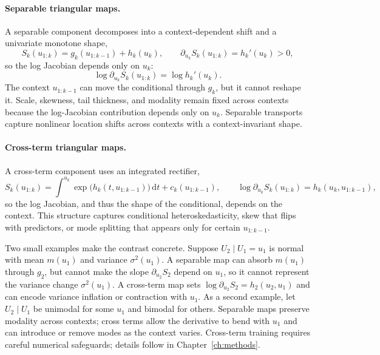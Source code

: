 \documentclass[11pt,a4paper,twoside]{book}\usepackage[]{graphicx}\usepackage[]{xcolor}
\begin{document}
\paragraph{Separable triangular maps.} A separable component decomposes into a context-dependent shift and a univariate monotone shape,
\begin{equation}
  S_k(u_{1:k}) = g_k(u_{1:k-1}) + h_k(u_k),
  \qquad
  \partial_{u_k}S_k(u_{1:k}) = h_k'(u_k) > 0,
  \label{eq:separable-component}
\end{equation}
so the log Jacobian depends only on $u_k$:
\begin{equation}
  \log \partial_{u_k}S_k(u_{1:k}) = \log h_k'(u_k).
  \label{eq:separable-jacobian}
\end{equation}
The context $u_{1:k-1}$ can move the conditional through $g_k$, but it cannot reshape it. Scale, skewness, tail thickness, and modality remain fixed across contexts because the log-Jacobian contribution depends only on $u_k$. Separable transports capture nonlinear location shifts across contexts with a context-invariant shape.

\paragraph{Cross-term triangular maps.} A cross-term component uses an integrated rectifier,
\begin{equation}
  S_k(u_{1:k})=\int^{u_k}\exp\big(h_k(t,u_{1:k-1})\big)\, \mathrm{d}t + c_k(u_{1:k-1}),
  \qquad
  \log \partial_{u_k}S_k(u_{1:k}) = h_k(u_k,u_{1:k-1}),
  \label{eq:cross-component}
\end{equation}
so the log Jacobian, and thus the shape of the conditional, depends on the context. This structure captures conditional heteroskedasticity, skew that flips with predictors, or mode splitting that appears only for certain $u_{1:k-1}$.

Two small examples make the contrast concrete. Suppose $U_2\mid U_1=u_1$ is normal with mean $m(u_1)$ and variance $\sigma^2(u_1)$. A separable map can absorb $m(u_1)$ through $g_2$, but cannot make the slope $\partial_{u_2}S_2$ depend on $u_1$, so it cannot represent the variance change $\sigma^2(u_1)$. A cross-term map sets $\log\partial_{u_2}S_2=h_2(u_2,u_1)$ and can encode variance inflation or contraction with $u_1$. As a second example, let $U_2\mid U_1$ be unimodal for some $u_1$ and bimodal for others. Separable maps preserve modality across contexts; cross terms allow the derivative to bend with $u_1$ and can introduce or remove modes as the context varies. Cross-term training requires careful numerical safeguards; details follow in Chapter~\ref{ch:methods}.
\end{document}
